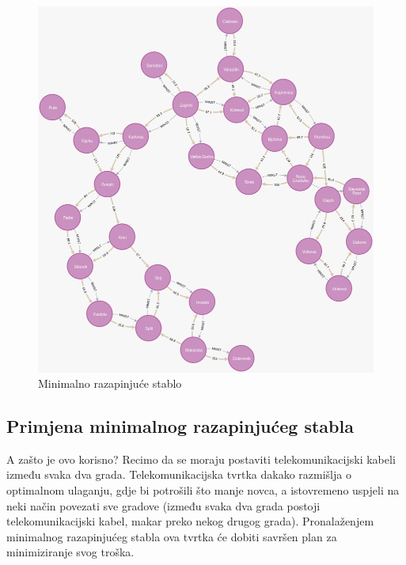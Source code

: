 \documentclass[10pt]{scrartcl}
\begin{document}
\begin{figure}[H]
\caption{Minimalno razapinjuće stablo}
\begin{center}
\includegraphics[scale=0.4]{MST}
\end{center}
\end{figure}

\subsection{Primjena minimalnog razapinjućeg stabla}
A zašto je ovo korisno? Recimo da se moraju postaviti telekomunikacijski kabeli između svaka dva grada. Telekomunikacijska tvrtka dakako razmišlja o optimalnom ulaganju, gdje bi potrošili što manje novca, a istovremeno uspjeli na neki način povezati sve gradove (između svaka dva grada postoji telekomunikacijski kabel, makar preko nekog drugog grada). Pronalaženjem minimalnog razapinjućeg stabla ova tvrtka će dobiti savršen plan za minimiziranje svog troška. 
\end{document}
